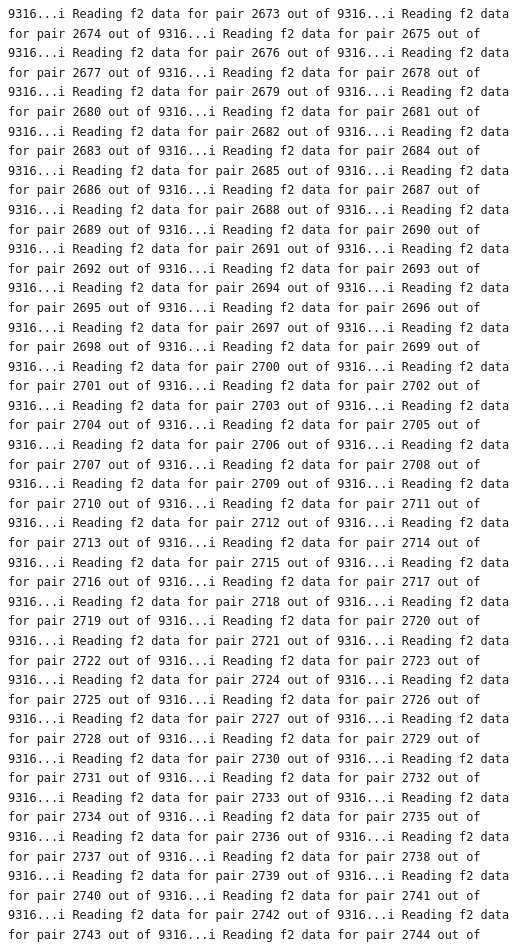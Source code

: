 \documentclass[
]{article}
\begin{document}
\begin{verbatim}
9316...i Reading f2 data for pair 2673 out of 9316...i Reading f2 data for pair 2674 out of 9316...i Reading f2 data for pair 2675 out of 9316...i Reading f2 data for pair 2676 out of 9316...i Reading f2 data for pair 2677 out of 9316...i Reading f2 data for pair 2678 out of 9316...i Reading f2 data for pair 2679 out of 9316...i Reading f2 data for pair 2680 out of 9316...i Reading f2 data for pair 2681 out of 9316...i Reading f2 data for pair 2682 out of 9316...i Reading f2 data for pair 2683 out of 9316...i Reading f2 data for pair 2684 out of 9316...i Reading f2 data for pair 2685 out of 9316...i Reading f2 data for pair 2686 out of 9316...i Reading f2 data for pair 2687 out of 9316...i Reading f2 data for pair 2688 out of 9316...i Reading f2 data for pair 2689 out of 9316...i Reading f2 data for pair 2690 out of 9316...i Reading f2 data for pair 2691 out of 9316...i Reading f2 data for pair 2692 out of 9316...i Reading f2 data for pair 2693 out of 9316...i Reading f2 data for pair 2694 out of 9316...i Reading f2 data for pair 2695 out of 9316...i Reading f2 data for pair 2696 out of 9316...i Reading f2 data for pair 2697 out of 9316...i Reading f2 data for pair 2698 out of 9316...i Reading f2 data for pair 2699 out of 9316...i Reading f2 data for pair 2700 out of 9316...i Reading f2 data for pair 2701 out of 9316...i Reading f2 data for pair 2702 out of 9316...i Reading f2 data for pair 2703 out of 9316...i Reading f2 data for pair 2704 out of 9316...i Reading f2 data for pair 2705 out of 9316...i Reading f2 data for pair 2706 out of 9316...i Reading f2 data for pair 2707 out of 9316...i Reading f2 data for pair 2708 out of 9316...i Reading f2 data for pair 2709 out of 9316...i Reading f2 data for pair 2710 out of 9316...i Reading f2 data for pair 2711 out of 9316...i Reading f2 data for pair 2712 out of 9316...i Reading f2 data for pair 2713 out of 9316...i Reading f2 data for pair 2714 out of 9316...i Reading f2 data for pair 2715 out of 9316...i Reading f2 data for pair 2716 out of 9316...i Reading f2 data for pair 2717 out of 9316...i Reading f2 data for pair 2718 out of 9316...i Reading f2 data for pair 2719 out of 9316...i Reading f2 data for pair 2720 out of 9316...i Reading f2 data for pair 2721 out of 9316...i Reading f2 data for pair 2722 out of 9316...i Reading f2 data for pair 2723 out of 9316...i Reading f2 data for pair 2724 out of 9316...i Reading f2 data for pair 2725 out of 9316...i Reading f2 data for pair 2726 out of 9316...i Reading f2 data for pair 2727 out of 9316...i Reading f2 data for pair 2728 out of 9316...i Reading f2 data for pair 2729 out of 9316...i Reading f2 data for pair 2730 out of 9316...i Reading f2 data for pair 2731 out of 9316...i Reading f2 data for pair 2732 out of 9316...i Reading f2 data for pair 2733 out of 9316...i Reading f2 data for pair 2734 out of 9316...i Reading f2 data for pair 2735 out of 9316...i Reading f2 data for pair 2736 out of 9316...i Reading f2 data for pair 2737 out of 9316...i Reading f2 data for pair 2738 out of 9316...i Reading f2 data for pair 2739 out of 9316...i Reading f2 data for pair 2740 out of 9316...i Reading f2 data for pair 2741 out of 9316...i Reading f2 data for pair 2742 out of 9316...i Reading f2 data for pair 2743 out of 9316...i Reading f2 data for pair 2744 out of 
\end{verbatim}
\end{document}
